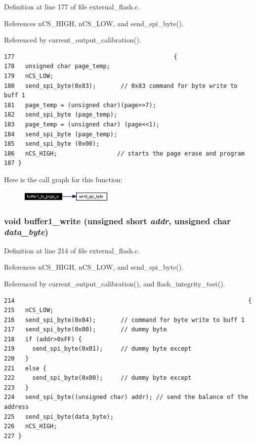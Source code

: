 Definition at line 177 of file external\_\-flash.c.

References n\-CS\_\-HIGH, n\-CS\_\-LOW, and send\_\-spi\_\-byte().

Referenced by current\_\-output\_\-calibration().

\footnotesize\begin{verbatim}177                                             {
178   unsigned char page_temp;
179   nCS_LOW;
180   send_spi_byte(0x83);       // 0x83 command for byte write to buff 1
181   page_temp = (unsigned char)(page>>7);
182   send_spi_byte (page_temp);
183   page_temp = (unsigned char) (page<<1);
184   send_spi_byte (page_temp);
185   send_spi_byte (0x00);
186   nCS_HIGH;                 // starts the page erase and program 
187 }
\end{verbatim}\normalsize 




Here is the call graph for this function:\begin{figure}[H]
\begin{center}
\leavevmode
\includegraphics[width=128pt]{external__flash_8c_a4_cgraph}
\end{center}
\end{figure}
\subsubsection{\setlength{\rightskip}{0pt plus 5cm}void buffer1\_\-write (unsigned short {\em addr}, unsigned char {\em data\_\-byte})}\label{external__flash_8c_a7}




Definition at line 214 of file external\_\-flash.c.

References n\-CS\_\-HIGH, n\-CS\_\-LOW, and send\_\-spi\_\-byte().

Referenced by current\_\-output\_\-calibration(), and flash\_\-integrity\_\-test().

\footnotesize\begin{verbatim}214                                                                  {
215   nCS_LOW;
216   send_spi_byte(0x84);       // command for byte write to buff 1
217   send_spi_byte(0x00);       // dummy byte
218   if (addr>0xFF) {
219     send_spi_byte(0x01);     // dummy byte except 
220   }
221   else {
222     send_spi_byte(0x00);     // dummy byte except 
223   }  
224   send_spi_byte((unsigned char) addr); // send the balance of the address
225   send_spi_byte(data_byte);
226   nCS_HIGH; 
227 }
\end{verbatim}\normalsize 




